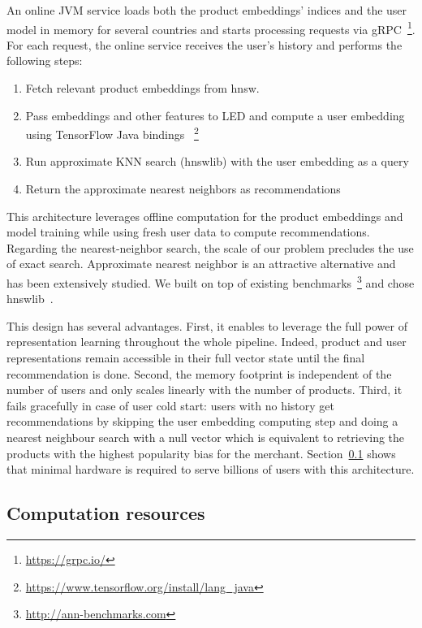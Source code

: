 \documentclass[sigconf]{acmart}
\begin{document}
An online JVM service loads both the product embeddings' indices and the user model in memory for several countries and starts processing requests via gRPC~\footnote{\url{https://grpc.io/}}. For each request, the online service receives the user's history and performs the following steps:
  \begin{enumerate}
    \item Fetch relevant product embeddings from hnsw.
    \item Pass embeddings and other features to LED and compute a user embedding using TensorFlow Java bindings ~\footnote{\url{https://www.tensorflow.org/install/lang_java}}
    \item Run approximate KNN search (hnswlib) with the user embedding as a query
    \item Return the approximate nearest neighbors as recommendations
\end{enumerate}



This architecture leverages offline computation for the product embeddings and model training while using fresh user data to compute recommendations.  Regarding the nearest-neighbor search, the scale of our problem precludes the use of exact search. Approximate nearest neighbor is an attractive alternative and has been extensively studied. We built on top of existing benchmarks~\footnote{\url{http://ann-benchmarks.com}} and chose hnswlib~\cite{hnswlib-2018}. 






This design has several advantages. First, it enables to leverage the full power of representation learning throughout the whole pipeline. Indeed, product and user representations remain accessible in their full vector state until the final recommendation is done. Second, the memory footprint is independent of the number of users and only scales linearly with the number of products. Third, it fails gracefully in case of user cold start: users with no history get recommendations by skipping the user embedding computing step and doing a nearest neighbour search with a null vector which is equivalent to retrieving the products with the highest popularity bias for the merchant. Section~\ref{subsec:compute-resources} shows that minimal hardware is required to serve billions of users with this architecture.

\subsection{Computation resources}
\label{subsec:compute-resources}
\end{document}
